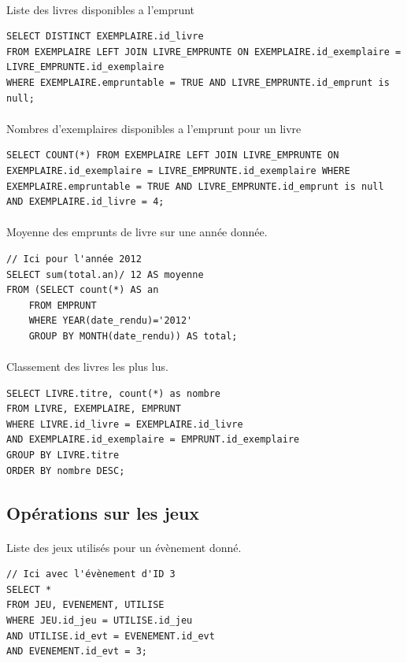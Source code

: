 \documentclass[a4paper, 11pt]{article}
\begin{document}
\paragraph{}
Liste des livres disponibles a l'emprunt
\begin{verbatim}
SELECT DISTINCT EXEMPLAIRE.id_livre 
FROM EXEMPLAIRE LEFT JOIN LIVRE_EMPRUNTE ON EXEMPLAIRE.id_exemplaire = LIVRE_EMPRUNTE.id_exemplaire
WHERE EXEMPLAIRE.empruntable = TRUE AND LIVRE_EMPRUNTE.id_emprunt is null;
\end{verbatim}
\paragraph{}
Nombres d'exemplaires disponibles a l'emprunt pour un livre
\begin{verbatim}
SELECT COUNT(*) FROM EXEMPLAIRE LEFT JOIN LIVRE_EMPRUNTE ON EXEMPLAIRE.id_exemplaire = LIVRE_EMPRUNTE.id_exemplaire WHERE EXEMPLAIRE.empruntable = TRUE AND LIVRE_EMPRUNTE.id_emprunt is null AND EXEMPLAIRE.id_livre = 4;
\end{verbatim}
\paragraph{}
Moyenne des emprunts de livre sur une année donnée.
\begin{verbatim}
// Ici pour l'année 2012
SELECT sum(total.an)/ 12 AS moyenne 
FROM (SELECT count(*) AS an 
    FROM EMPRUNT 
    WHERE YEAR(date_rendu)='2012' 
    GROUP BY MONTH(date_rendu)) AS total;
\end{verbatim}
\paragraph{}
Classement des livres les plus lus.
\begin{verbatim}
SELECT LIVRE.titre, count(*) as nombre 
FROM LIVRE, EXEMPLAIRE, EMPRUNT 
WHERE LIVRE.id_livre = EXEMPLAIRE.id_livre 
AND EXEMPLAIRE.id_exemplaire = EMPRUNT.id_exemplaire 
GROUP BY LIVRE.titre 
ORDER BY nombre DESC;
\end{verbatim}
\subsection{Opérations sur les jeux}
\paragraph{}
Liste des jeux utilisés pour un évènement donné.
\begin{verbatim}
// Ici avec l'évènement d'ID 3
SELECT *
FROM JEU, EVENEMENT, UTILISE
WHERE JEU.id_jeu = UTILISE.id_jeu
AND UTILISE.id_evt = EVENEMENT.id_evt
AND EVENEMENT.id_evt = 3;
\end{verbatim}
\end{document}
